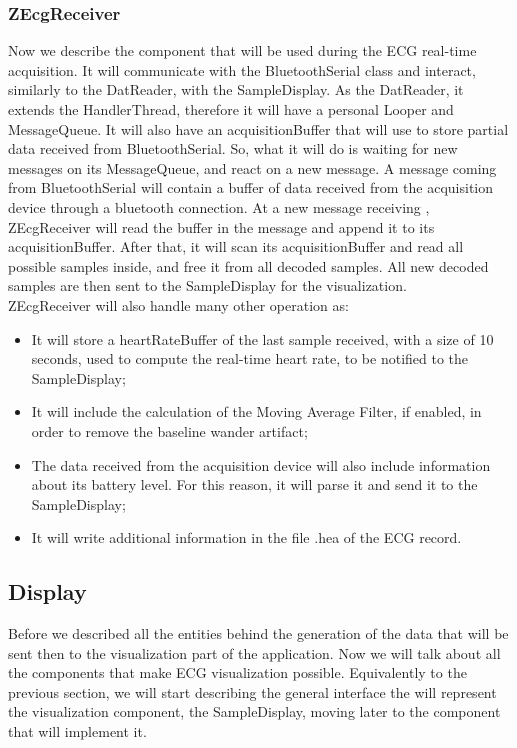 \subsubsection{ ZEcgReceiver}
Now we describe the component that will be used during the ECG real-time acquisition. It will communicate with the BluetoothSerial class and interact, similarly to the DatReader, with the SampleDisplay. As the DatReader, it extends the HandlerThread, therefore it will have a personal Looper and MessageQueue. It will also have an acquisitionBuffer that will use to store partial data received from BluetoothSerial. So, what it will do is waiting for new messages on its MessageQueue, and react on a new message. A message coming from BluetoothSerial will contain a buffer of data received from the acquisition device through a bluetooth connection. At a new message receiving , ZEcgReceiver will read the buffer in the message and append it to its acquisitionBuffer. After that,  it will scan its acquisitionBuffer and read all possible samples inside, and free it from all decoded samples. All new decoded samples are then sent to the SampleDisplay for the visualization.\\
ZEcgReceiver will also handle many other operation as:
\begin{itemize}
	\item It will store a heartRateBuffer of the last sample received, with a size of 10 seconds, used to compute the real-time heart rate, to be notified to the SampleDisplay;
	\item It will include the calculation of the Moving Average Filter, if enabled, in order to remove the baseline wander artifact;
	\item The data received from the acquisition device will also include information about its battery level. For this reason, it will parse it and send it to the SampleDisplay;
	\item It will write additional information in the file .hea of the ECG record. 
\end{itemize}

\subsection{Display}
Before we described all the entities behind the generation of the data that will be sent then to the visualization part of the application. Now we will talk about all the components that make ECG visualization possible. Equivalently to the previous section, we will start describing the general interface the will represent the visualization component, the SampleDisplay, moving later to the component that will implement it.

